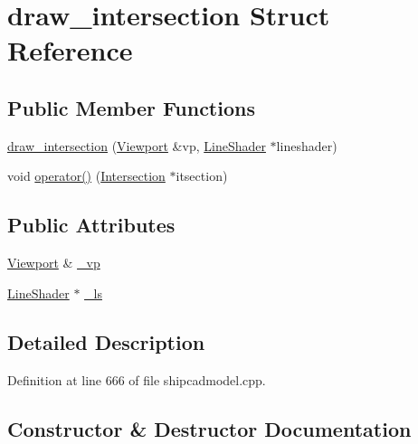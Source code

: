 \hypertarget{structdraw__intersection}{}\section{draw\+\_\+intersection Struct Reference}
\label{structdraw__intersection}
\subsection*{Public Member Functions}
\begin{DoxyCompactItemize}
\item 
\hyperlink{structdraw__intersection_a4471bc736f3a58dc15f577144772601b}{draw\+\_\+intersection} (\hyperlink{classShipCAD_1_1Viewport}{Viewport} \&vp, \hyperlink{classShipCAD_1_1LineShader}{Line\+Shader} $\ast$lineshader)
\item 
void \hyperlink{structdraw__intersection_a3515516eb4ac321e9a1323140b9f47b0}{operator()} (\hyperlink{classShipCAD_1_1Intersection}{Intersection} $\ast$itsection)
\end{DoxyCompactItemize}
\subsection*{Public Attributes}
\begin{DoxyCompactItemize}
\item 
\hyperlink{classShipCAD_1_1Viewport}{Viewport} \& \hyperlink{structdraw__intersection_a4550bf7c1203e48abdc041e4e248c5f7}{\+\_\+vp}
\item 
\hyperlink{classShipCAD_1_1LineShader}{Line\+Shader} $\ast$ \hyperlink{structdraw__intersection_a5f59d55f5e41a2585af4fea6a4d93374}{\+\_\+ls}
\end{DoxyCompactItemize}


\subsection{Detailed Description}


Definition at line 666 of file shipcadmodel.\+cpp.



\subsection{Constructor \& Destructor Documentation}
